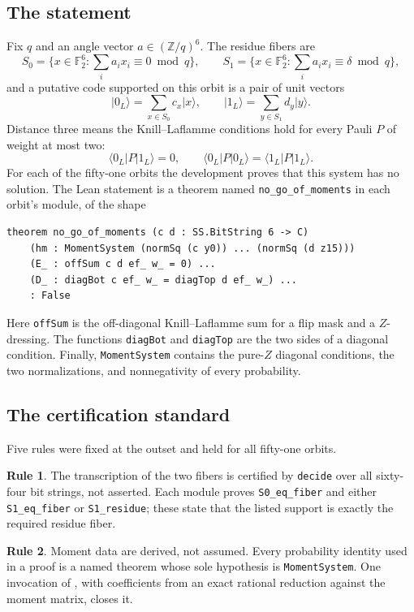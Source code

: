 \documentclass[11pt,a4paper]{article}
\providecommand{\ket}[1]{\lvert #1 \rangle}
\providecommand{\bra}[1]{\langle #1 \rvert}
\newcommand{\Sz}{S_0}
\newcommand{\So}{S_1}
\newcommand{\FF}{\mathbb{F}}
\newcommand{\lean}[1]{\texttt{#1}}
\theoremstyle{definition}
\newtheorem{standard}{Rule}
\begin{document}
\subsection{The statement}

Fix $q$ and an angle vector $a \in (\mathbb{Z}/q)^6$. The residue fibers are
\[
  \Sz = \{x \in \FF_2^6 : \textstyle\sum_i a_i x_i \equiv 0 \bmod q\},
  \qquad
  \So = \{x \in \FF_2^6 : \textstyle\sum_i a_i x_i \equiv \delta \bmod q\},
\]
and a putative code supported on this orbit is a pair of unit vectors
\[
  \ket{0_L} = \sum_{x \in \Sz} c_x \ket{x},
  \qquad
  \ket{1_L} = \sum_{y \in \So} d_y \ket{y}.
\]
Distance three means the Knill--Laflamme conditions hold for every Pauli $P$ of
weight at most two:
\[
  \bra{0_L} P \ket{1_L} = 0,
  \qquad
  \bra{0_L} P \ket{0_L} = \bra{1_L} P \ket{1_L}.
\]
For each of the fifty-one orbits the development proves that this system has
no solution. The Lean statement is a theorem named
\lean{no\_go\_of\_moments} in each orbit's module, of the shape
\begin{lstlisting}
theorem no_go_of_moments (c d : SS.BitString 6 -> C)
    (hm : MomentSystem (normSq (c y0)) ... (normSq (d z15)))
    (E_ : offSum c d ef_ w_ = 0) ...
    (D_ : diagBot c ef_ w_ = diagTop d ef_ w_) ...
    : False
\end{lstlisting}
Here \lean{offSum} is the off-diagonal Knill--Laflamme sum for a flip mask and a
$Z$-dressing. The functions \lean{diagBot} and \lean{diagTop} are the two sides
of a diagonal condition. Finally, \lean{MomentSystem} contains the pure-$Z$
diagonal conditions, the two normalizations, and nonnegativity of every
probability.

\subsection{The certification standard}
\label{sec:standard}

Five rules were fixed at the outset and held for all fifty-one orbits.

\begin{standard}
The transcription of the two fibers is certified by \lean{decide} over all
sixty-four bit strings, not asserted. Each module proves
\lean{S0\_eq\_fiber} and either \lean{S1\_eq\_fiber} or
\lean{S1\_residue}; these state that the listed support is exactly the required
residue fiber.
\end{standard}

\begin{standard}
Moment data are derived, not assumed. Every probability identity used in a proof
is a named theorem whose sole hypothesis is \lean{MomentSystem}. One invocation
of , with coefficients from an exact rational reduction
against the moment matrix, closes it.
\end{standard}
\end{document}
